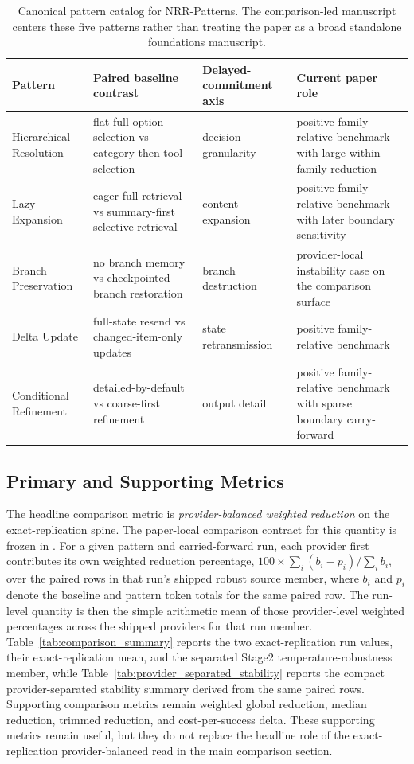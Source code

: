 \documentclass[11pt,a4paper]{article}
\begin{document}
\begin{table}[t]
\centering
\small
\begin{tabular}{L{3.0cm}L{4.2cm}L{2.5cm}L{4.0cm}}
\toprule
\textbf{Pattern} & \textbf{Paired baseline contrast} & \textbf{Delayed-commitment axis} & \textbf{Current paper role} \\
\midrule
Hierarchical Resolution & flat full-option selection vs category-then-tool selection & decision granularity & positive family-relative benchmark with large within-family reduction \\
Lazy Expansion & eager full retrieval vs summary-first selective retrieval & content expansion & positive family-relative benchmark with later boundary sensitivity \\
Branch Preservation & no branch memory vs checkpointed branch restoration & branch destruction & provider-local instability case on the comparison surface \\
Delta Update & full-state resend vs changed-item-only updates & state retransmission & positive family-relative benchmark \\
Conditional Refinement & detailed-by-default vs coarse-first refinement & output detail & positive family-relative benchmark with sparse boundary carry-forward \\
\bottomrule
\end{tabular}
\caption{Canonical pattern catalog for NRR-Patterns. The comparison-led manuscript centers these five patterns rather than treating the paper as a broad standalone foundations manuscript.}
\label{tab:pattern_catalog}
\end{table}

\subsection{Primary and Supporting Metrics}

The headline comparison metric is \emph{provider-balanced weighted reduction} on the exact-replication spine. The paper-local comparison contract for this quantity is frozen in . For a given pattern and carried-forward run, each provider first contributes its own weighted reduction percentage, \(100 \times \sum_i (b_i - p_i) / \sum_i b_i\), over the paired rows in that run's shipped robust source member, where \(b_i\) and \(p_i\) denote the baseline and pattern token totals for the same paired row. The run-level quantity  is then the simple arithmetic mean of those provider-level weighted percentages across the shipped providers for that run member. Table~\ref{tab:comparison_summary} reports the two exact-replication run values, their exact-replication mean, and the separated Stage2 temperature-robustness member, while Table~\ref{tab:provider_separated_stability} reports the compact provider-separated stability summary derived from the same paired rows. Supporting comparison metrics remain weighted global reduction, median reduction, trimmed reduction, and cost-per-success delta. These supporting metrics remain useful, but they do not replace the headline role of the exact-replication provider-balanced read in the main comparison section.
\end{document}
